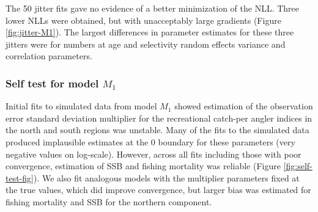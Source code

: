 \documentclass[
]{article}
\begin{document}
The 50 jitter fits gave no evidence of a better minimization of the NLL. Three lower NLLs were obtained, but with unacceptably large gradients (Figure \ref{fig:jitter-M1}). The largest differences in parameter estimates for these three jitters were for numbers at age and selectivity random effects variance and correlation parameters.

\hypertarget{self-test-for-model-m_1}{%
\subsubsection*{\texorpdfstring{Self test for model \(M_1\)}{Self test for model M\_1}}\label{self-test-for-model-m_1}}

Initial fits to simulated data from model \(M_1\) showed estimation of the observation error standard deviation multiplier for the recreational catch-per angler indices in the north and south regions was unstable. Many of the fits to the simulated data produced implausible estimates at the 0 boundary for these parameters (very negative values on log-scale). However, across all fits including those with poor convergence, estimation of SSB and fishing mortality was reliable (Figure \ref{fig:self-test-fig}). We also fit analogous models with the multiplier parameters fixed at the true values, which did improve convergence, but larger bias was estimated for fishing mortality and SSB for the northern component.

\setcounter{table}{0}
\renewcommand\thetable{S\arabic{table}}
\end{document}
